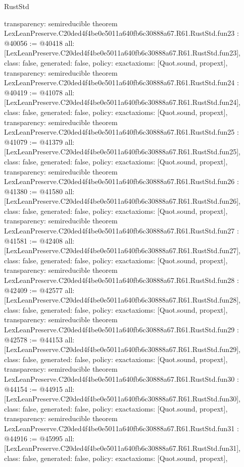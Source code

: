 \begin{lexlean}{RustStd}
\begin{coremodule}
{  transparency: semireducible
}
theorem LexLeanPreserve.C20ded4f4be0e5011a640fb6c30888a67.R61.RustStd.fun23 : @40056 := @40418 {
  all: [LexLeanPreserve.C20ded4f4be0e5011a640fb6c30888a67.R61.RustStd.fun23],
  class: false,
  generated: false,
  policy: exact{axioms: [Quot.sound, propext]},
  transparency: semireducible
}
theorem LexLeanPreserve.C20ded4f4be0e5011a640fb6c30888a67.R61.RustStd.fun24 : @40419 := @41078 {
  all: [LexLeanPreserve.C20ded4f4be0e5011a640fb6c30888a67.R61.RustStd.fun24],
  class: false,
  generated: false,
  policy: exact{axioms: [Quot.sound, propext]},
  transparency: semireducible
}
theorem LexLeanPreserve.C20ded4f4be0e5011a640fb6c30888a67.R61.RustStd.fun25 : @41079 := @41379 {
  all: [LexLeanPreserve.C20ded4f4be0e5011a640fb6c30888a67.R61.RustStd.fun25],
  class: false,
  generated: false,
  policy: exact{axioms: [Quot.sound, propext]},
  transparency: semireducible
}
theorem LexLeanPreserve.C20ded4f4be0e5011a640fb6c30888a67.R61.RustStd.fun26 : @41380 := @41580 {
  all: [LexLeanPreserve.C20ded4f4be0e5011a640fb6c30888a67.R61.RustStd.fun26],
  class: false,
  generated: false,
  policy: exact{axioms: [Quot.sound, propext]},
  transparency: semireducible
}
theorem LexLeanPreserve.C20ded4f4be0e5011a640fb6c30888a67.R61.RustStd.fun27 : @41581 := @42408 {
  all: [LexLeanPreserve.C20ded4f4be0e5011a640fb6c30888a67.R61.RustStd.fun27],
  class: false,
  generated: false,
  policy: exact{axioms: [Quot.sound, propext]},
  transparency: semireducible
}
theorem LexLeanPreserve.C20ded4f4be0e5011a640fb6c30888a67.R61.RustStd.fun28 : @42409 := @42577 {
  all: [LexLeanPreserve.C20ded4f4be0e5011a640fb6c30888a67.R61.RustStd.fun28],
  class: false,
  generated: false,
  policy: exact{axioms: [Quot.sound, propext]},
  transparency: semireducible
}
theorem LexLeanPreserve.C20ded4f4be0e5011a640fb6c30888a67.R61.RustStd.fun29 : @42578 := @44153 {
  all: [LexLeanPreserve.C20ded4f4be0e5011a640fb6c30888a67.R61.RustStd.fun29],
  class: false,
  generated: false,
  policy: exact{axioms: [Quot.sound, propext]},
  transparency: semireducible
}
theorem LexLeanPreserve.C20ded4f4be0e5011a640fb6c30888a67.R61.RustStd.fun30 : @44154 := @44915 {
  all: [LexLeanPreserve.C20ded4f4be0e5011a640fb6c30888a67.R61.RustStd.fun30],
  class: false,
  generated: false,
  policy: exact{axioms: [Quot.sound, propext]},
  transparency: semireducible
}
theorem LexLeanPreserve.C20ded4f4be0e5011a640fb6c30888a67.R61.RustStd.fun31 : @44916 := @45995 {
  all: [LexLeanPreserve.C20ded4f4be0e5011a640fb6c30888a67.R61.RustStd.fun31],
  class: false,
  generated: false,
  policy: exact{axioms: [Quot.sound, propext]},
}
\end{coremodule}
\end{lexlean}

